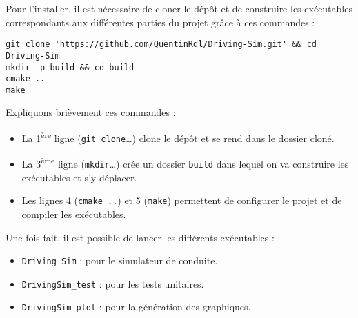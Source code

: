 Pour l'installer, il est nécessaire de cloner le dépôt et de construire les exécutables correspondants aux différentes parties du projet grâce à ces commandes :

\begin{lstlisting}[style=bashStyle,label={lst:build}]
git clone 'https://github.com/QuentinRdl/Driving-Sim.git' && cd Driving-Sim
mkdir -p build && cd build
cmake ..
make
\end{lstlisting}
\noindent
Expliquons brièvement ces commandes :
\begin{itemize}
    \item La 1\textsuperscript{ère} ligne (\texttt{git clone}\dots) clone le dépôt et se rend dans le dossier cloné.
    \item La 3\textsuperscript{ème} ligne (\texttt{mkdir}\dots) crée un dossier \texttt{build} dans lequel on va construire les exécutables et s'y déplacer.
    \item Les lignes 4 (\texttt{cmake ..}) et 5 (\texttt{make}) permettent de configurer le projet et de compiler les exécutables.
\end{itemize}

\noindent
Une fois fait, il est possible de lancer les différents exécutables :
\begin{itemize}
    \item \texttt{Driving\_Sim} : pour le simulateur de conduite.
    \item \texttt{DrivingSim\_test} : pour les tests unitaires.
    \item \texttt{DrivingSim\_plot} : pour la génération des graphiques.
\end{itemize}
